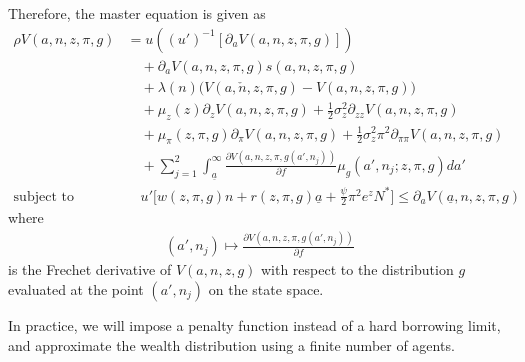 \documentclass[notitlepage,a4paper,11pt]{report}
\numberwithin{section}{chapter}
\numberwithin{subsection}{section}
\begin{document}
Therefore, the master equation is given as 
\begin{align*}
\rho V(a,n,z,\pi,g) & = u \left(  (u')^{-1} \left[ \partial_a V(a,n,z, \pi,g) \right]  \right) \tag{Flow Utility + FOC} \\[10pt]
& \quad + \partial_a V(a,n,z,\pi,g) s(a,n,z,\pi,g)  \tag{Individual Wealth} \\[10pt]
& \quad + \lambda(n) \Big( V(a,\check{n},z,\pi,g)- V(a,n,z,\pi,g) \Big)\tag{Individual Labor Supply} \\[10pt]
& \quad + \mu_z(z) \partial_z V(a,n,z,\pi,g) + \frac{1}{2} \sigma_z^2 \partial_{zz} V(a,n,z,\pi,g) \tag{TFP} \\[10pt]
& \quad + \mu_{\pi}(z,\pi,g) \partial_{\pi} V(a,n,z,\pi,g)+ \frac{1}{2} \sigma_z^2 \pi^2 \partial_{\pi \pi} V(a,n,z,\pi,g) \tag{Inflation} \\[10pt]
& \quad + \sum_{j=1}^2 \int_{\underline{a}}^{\infty} \frac{\partial V(a,n,z,\pi,g(a',n_j)) }{\partial f} \mu_g( a', n_j ; z,\pi, g) da'  \tag{Wealth Distribution}  \\[20pt]
\text{subject to} & \quad u' \Big[ w(z,\pi,g) n + r(z,\pi,g) \underline{a} + \frac{\psi}{2} \pi^2 e^z N^*  \Big] \leq \partial_a V(\underline{a}, n, z, \pi, g)  \tag{Boundary Constraint} 
\end{align*}
where 
\begin{align*}
(a',n_j) \mapsto \frac{\partial V(a,n,z,\pi,g(a',n_j)) }{\partial f}  
\end{align*}
is the Frechet derivative of $V(a,n, z, g)$ with respect to the distribution $g$ evaluated at the point $(a',n_j)$ on the state space. 


In practice, we will impose a penalty function instead of a hard borrowing limit, and approximate the wealth distribution using a finite number of agents. 
\end{document}
